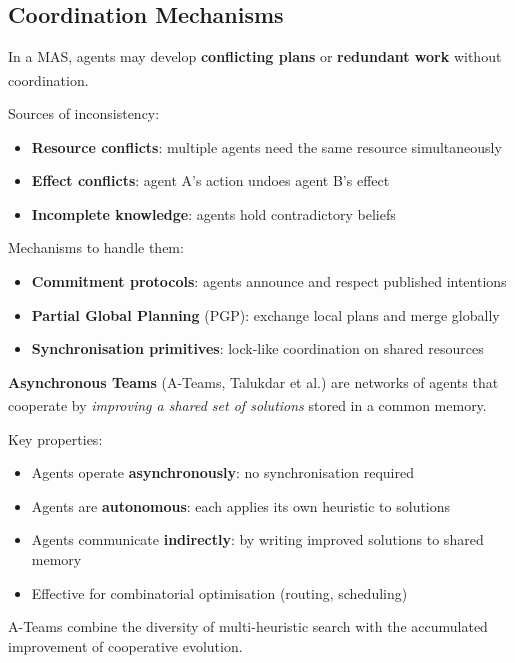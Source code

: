 \subsection{Coordination Mechanisms}
\begin{tcbitemize}[ skin=sectionraster ]

    \tcbitem[title=Coordination and Inconsistency, raster multicolumn=3]
    In a MAS, agents may develop \textbf{conflicting plans} or
    \textbf{redundant work} without coordination.
    \textsuperscript{\cite[][p.~172]{wooldridgeIntroductionMultiAgentSystems2009}}

    Sources of inconsistency:
    \begin{itemize}
        \item \textbf{Resource conflicts}: multiple agents need the same resource simultaneously
        \item \textbf{Effect conflicts}: agent A's action undoes agent B's effect
        \item \textbf{Incomplete knowledge}: agents hold contradictory beliefs
    \end{itemize}
    Mechanisms to handle them:
    \begin{itemize}
        \item \textbf{Commitment protocols}: agents announce and respect published intentions
        \item \textbf{Partial Global Planning} (PGP): exchange local plans and merge globally
        \item \textbf{Synchronisation primitives}: lock-like coordination on shared resources
    \end{itemize}

    \tcbitem[title=Asynchronous Teams, raster multicolumn=3]
    \textbf{Asynchronous Teams} (A-Teams, Talukdar et al.) are networks of agents
    that cooperate by \emph{improving a shared set of solutions} stored in a
    common memory.\textsuperscript{\cite{talukdarASYNCHRONOUSTEAMSCOOPERATION}}

    Key properties:
    \begin{itemize}
        \item Agents operate \textbf{asynchronously}: no synchronisation required
        \item Agents are \textbf{autonomous}: each applies its own heuristic to solutions
        \item Agents communicate \textbf{indirectly}: by writing improved solutions to shared memory
        \item Effective for combinatorial optimisation (routing, scheduling)
    \end{itemize}
    A-Teams combine the diversity of multi-heuristic search with the
    accumulated improvement of cooperative evolution.

\end{tcbitemize}

